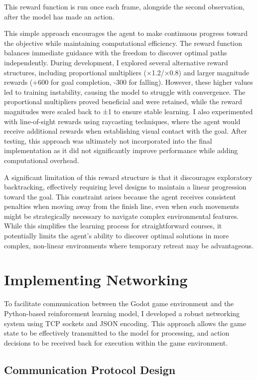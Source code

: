 This reward function is run once each frame, alongside the second observation, after the model has made an action.

This simple approach encourages the agent to make continuous progress toward the objective while maintaining computational efficiency. 
The reward function balances immediate guidance with the freedom to discover optimal paths independently.
During development, I explored several alternative reward structures, including proportional multipliers (×1.2/×0.8) and larger magnitude rewards (+600 for goal completion, -300 for falling). 
However, these higher values led to training instability, causing the model to struggle with convergence. The proportional multipliers proved beneficial and were retained, while the reward magnitudes were scaled back to ±1 to ensure stable learning.
I also experimented with line-of-sight rewards using raycasting techniques, where the agent would receive additional rewards when establishing visual contact with the goal. 
After testing, this approach was ultimately not incorporated into the final implementation as it did not significantly improve performance while adding computational overhead.

A significant limitation of this reward structure is that it discourages exploratory backtracking, effectively requiring level designs to maintain a linear progression toward the goal. 
This constraint arises because the agent receives consistent penalties when moving away from the finish line, even when such movements might be strategically necessary to navigate complex environmental features. 
While this simplifies the learning process for straightforward courses, it potentially limits the agent's ability to discover optimal solutions in more complex, non-linear environments where temporary retreat may be advantageous.

\section{Implementing Networking}

To facilitate communication between the Godot game environment and the Python-based reinforcement learning model, I developed a robust networking system using TCP sockets and JSON encoding. This approach allows the game state to be effectively transmitted to the model for processing, and action decisions to be received back for execution within the game environment.

\subsection{Communication Protocol Design}

